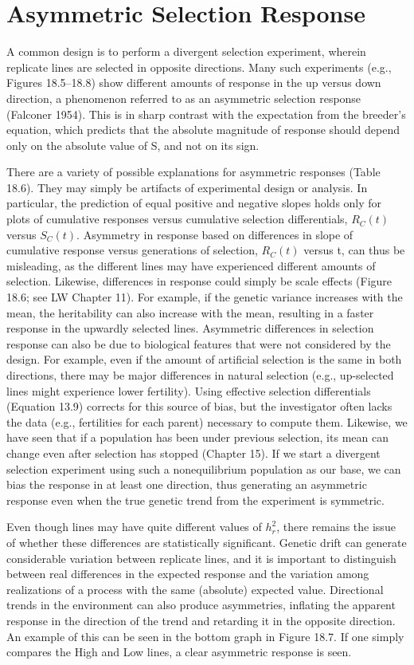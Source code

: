 \documentclass{article}
\begin{document}
\section{Asymmetric Selection Response}
A common design is to perform a divergent selection experiment, wherein replicate lines are selected in opposite directions. Many such experiments (e.g., Figures 18.5–18.8) show different amounts of response in the up versus down direction, a phenomenon referred to as an asymmetric selection response (Falconer 1954). This is in sharp contrast with the expectation from the breeder's equation, which predicts that the absolute magnitude of response should depend only on the absolute value of S, and not on its sign.

There are a variety of possible explanations for asymmetric responses (Table 18.6). They may simply be artifacts of experimental design or analysis. In particular, the prediction of equal positive and negative slopes holds only for plots of cumulative responses versus cumulative selection differentials,  $ R_{C}(t) $ versus  $ S_{C}(t) $. Asymmetry in response based on differences in slope of cumulative response versus generations of selection,  $ R_{C}(t) $ versus t, can thus be misleading, as the different lines may have experienced different amounts of selection. Likewise, differences in response could simply be scale effects (Figure 18.6; see LW Chapter 11). For example, if the genetic variance increases with the mean, the heritability can also increase with the mean, resulting in a faster response in the upwardly selected lines. Asymmetric differences in selection response can also be due to biological features that were not considered by the design. For example, even if the amount of artificial selection is the same in both directions, there may be major differences in natural selection (e.g., up-selected lines might experience lower fertility). Using effective selection differentials (Equation 13.9) corrects for this source of bias, but the investigator often lacks the data (e.g., fertilities for each parent) necessary to compute them. Likewise, we have seen that if a population has been under previous selection, its mean can change even after selection has stopped (Chapter 15). If we start a divergent selection experiment using such a nonequilibrium population as our base, we can bias the response in at least one direction, thus generating an asymmetric response even when the true genetic trend from the experiment is symmetric.

Even though lines may have quite different values of  $ h_{r}^{2} $, there remains the issue of whether these differences are statistically significant. Genetic drift can generate considerable variation between replicate lines, and it is important to distinguish between real differences in the expected response and the variation among realizations of a process with the same (absolute) expected value. Directional trends in the environment can also produce asymmetries, inflating the apparent response in the direction of the trend and retarding it in the opposite direction. An example of this can be seen in the bottom graph in Figure 18.7. If one simply compares the High and Low lines, a clear asymmetric response is seen.
\end{document}
